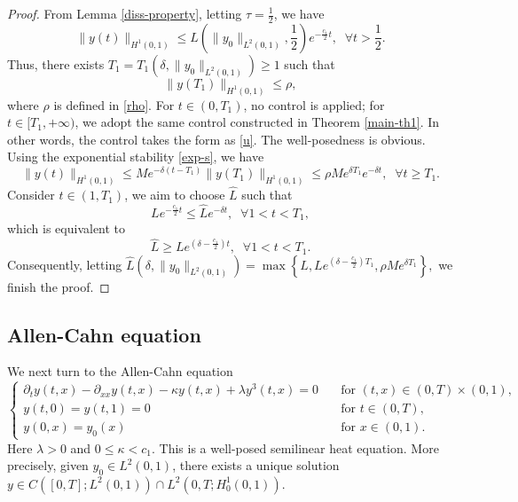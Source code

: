 \documentclass[review]{elsarticle}
\numberwithin{equation}{section}
\begin{document}
\begin{proof}
    From {Lemma} \ref{diss-property}, letting $\tau=\frac{1}{2}$, we have
    \begin{equation*}
         \| y(t)\|_{H^1(0,1)}\le L\left(\|y_0\|_{L^2(0,1)},\frac{1}{2}\right)e^{-\frac{c_1 }{2}t},\;\;\forall t>\frac{1}{2}.
    \end{equation*}
    Thus, there exists ${T}_1={T}_1\left(\delta,\|y_0\|_{L^2(0,1)}\right)\ge1$ such that
    \begin{equation*}
        \|y(T_1)\|_{H^1(0,1)}\le \rho,
    \end{equation*}
where \(\rho\) is defined in \eqref{rho}. For $t\in (0,{T}_1)$, no control is applied; for $t\in [{T}_1,+\infty)$, we adopt the same control constructed in {Theorem} \ref{main-th1}. In other words, the control takes the form as \eqref{u}. The well-posedness is obvious. Using the exponential stability \eqref{exp-s}, we have
\begin{equation*}
    \|y(t)\|_{H^1(0,1)}\le {{M}}e^{-\delta(t-{T}_1)}\|y({T}_1)\|_{H^1(0,1)}\le \rho {{M}}e^{\delta {T}_1}e^{-\delta t},\;\; \forall t\ge {T}_1.
\end{equation*}
Consider $t\in (1,{T}_1)$, we aim to choose $\hat{L}$ such that
\begin{equation*}
    Le^{-\frac{c_1}{2}t}\le \hat{L}e^{-\delta t},\;\;\forall 1<t<{T}_1,
\end{equation*}
which is equivalent to
\begin{equation*}
    \hat{L}\ge Le^{(\delta-\frac{c_1}{2})t},\;\;\forall 1<t<{T}_1.
\end{equation*}
Consequently, letting $\hat{L}\left(\delta,\|y_0\|_{L^2(0,1)}\right)=\max\left\{L,Le^{(\delta-\frac{c_1}{2}){T}_1},\rho {{M}}e^{\delta {T}_1}\right\},$ we finish the proof.
\end{proof}

\subsection{Allen-Cahn equation}

We next turn to the Allen-Cahn equation
\begin{equation}
    \label{C-Ieqs}
    \left\{\begin{array}{ll}
        \partial_t y(t,x)-\partial_{xx}y(t,x)-\kappa y(t,x) +\lambda y^3(t,x) =0&\quad \text{for }(t,x)\in (0,T)\times (0,1),\\
        y(t,0)=y(t,1)=0 &\quad \text{for }t\in (0,T),\\
        y(0,x)=y_0(x)&\quad \text{for }x\in (0,1).
\end{array}\right.
\end{equation}
Here $\lambda>0$ and $0\le \kappa< c_1 $. This is a well-posed semilinear heat equation. More precisely, given $y_0\in L^2(0,1)$, there exists a unique solution $y\in C([0,{T}];L^2(0,1))\cap L^2(0,{T};H_0^1(0,1))$. 
\end{document}
